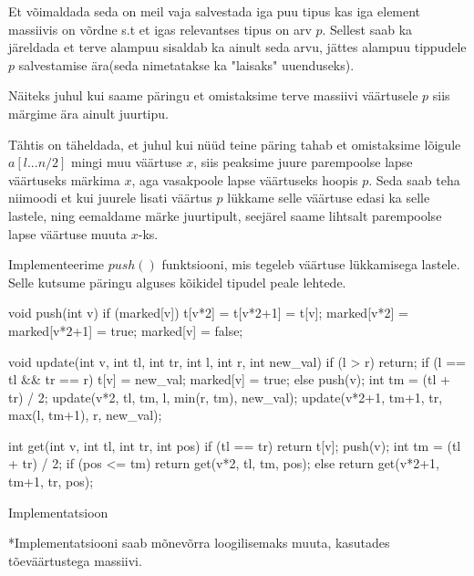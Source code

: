 \documentclass{trkut}
\theoremstyle{definition}
\begin{document}
Et võimaldada seda on meil vaja salvestada iga puu tipus kas iga element massiivis on võrdne s.t et igas relevantses tipus on arv $p$. Sellest saab ka järeldada et terve alampuu sisaldab ka ainult seda arvu, jättes alampuu tippudele $p$ salvestamise ära(seda nimetatakse ka "laisaks" uuenduseks). \parencite{EMaxx}

Näiteks juhul kui saame päringu et omistaksime terve massiivi väärtusele $p$ siis märgime ära ainult juurtipu.\parencite{EMaxx}

Tähtis on täheldada, et juhul kui nüüd teine päring tahab et omistaksime lõigule $a[l...n/2]$ mingi muu väärtuse $x$, siis peaksime juure parempoolse lapse väärtuseks märkima $x$, aga vasakpoole lapse väärtuseks hoopis $p$. Seda saab teha niimoodi et kui juurele lisati väärtus $p$ lükkame selle väärtuse edasi ka selle lastele, ning eemaldame märke juurtipult, seejärel saame lihtsalt parempoolse lapse väärtuse muuta $x$-ks. \parencite{EMaxx}

Implementeerime $push()$ funktsiooni, mis tegeleb väärtuse lükkamisega lastele. Selle kutsume päringu alguses kõikidel tipudel peale lehtede. \parencite{EMaxx}
\begin{cclol}
void push(int v) {
    if (marked[v]) {
        t[v*2] = t[v*2+1] = t[v];
        marked[v*2] = marked[v*2+1] = true;
        marked[v] = false;
    }
}

void update(int v, int tl, int tr, int l, int r, int new_val) {
    if (l > r) 
        return;
    if (l == tl && tr == r) {
        t[v] = new_val;
        marked[v] = true;
    } else {
        push(v);
        int tm = (tl + tr) / 2;
        update(v*2, tl, tm, l, min(r, tm), new_val);
        update(v*2+1, tm+1, tr, max(l, tm+1), r, new_val);
    }
}

int get(int v, int tl, int tr, int pos) {
    if (tl == tr) {
        return t[v];
    }
    push(v);
    int tm = (tl + tr) / 2;
    if (pos <= tm) 
        return get(v*2, tl, tm, pos);
    else
        return get(v*2+1, tm+1, tr, pos);
}
\end{cclol}
 \begin{kk}[H]%
    \caption{Implementatsioon}%
    \label{EMaxx}%
    \end{kk}
*Implementatsiooni saab mõnevõrra loogilisemaks muuta, kasutades tõeväärtustega massiivi.
\end{document}

